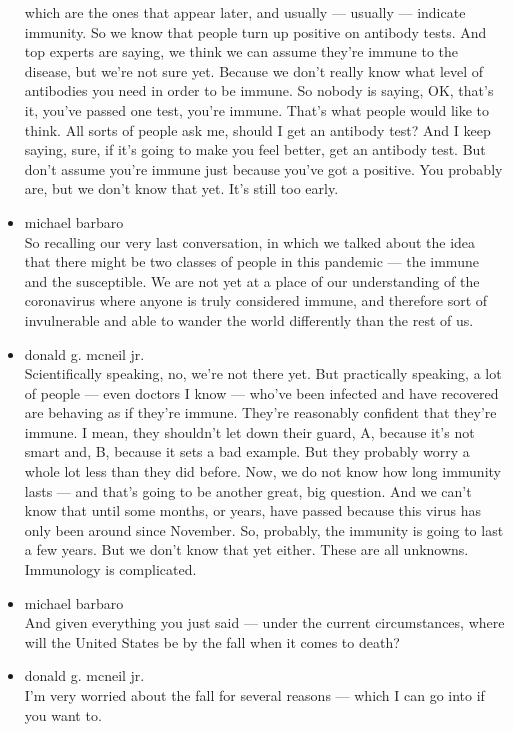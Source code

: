 \begin{itemize}
  which are the ones that appear later, and usually --- usually ---
  indicate immunity. So we know that people turn up positive on antibody
  tests. And top experts are saying, we think we can assume they're
  immune to the disease, but we're not sure yet. Because we don't really
  know what level of antibodies you need in order to be immune. So
  nobody is saying, OK, that's it, you've passed one test, you're
  immune. That's what people would like to think. All sorts of people
  ask me, should I get an antibody test? And I keep saying, sure, if
  it's going to make you feel better, get an antibody test. But don't
  assume you're immune just because you've got a positive. You probably
  are, but we don't know that yet. It's still too early.
\item
  michael barbaro\\
  So recalling our very last conversation, in which we talked about the
  idea that there might be two classes of people in this pandemic ---
  the immune and the susceptible. We are not yet at a place of our
  understanding of the coronavirus where anyone is truly considered
  immune, and therefore sort of invulnerable and able to wander the
  world differently than the rest of us.
\item
  donald g. mcneil jr.\\
  Scientifically speaking, no, we're not there yet. But practically
  speaking, a lot of people --- even doctors I know --- who've been
  infected and have recovered are behaving as if they're immune. They're
  reasonably confident that they're immune. I mean, they shouldn't let
  down their guard, A, because it's not smart and, B, because it sets a
  bad example. But they probably worry a whole lot less than they did
  before. Now, we do not know how long immunity lasts --- and that's
  going to be another great, big question. And we can't know that until
  some months, or years, have passed because this virus has only been
  around since November. So, probably, the immunity is going to last a
  few years. But we don't know that yet either. These are all unknowns.
  Immunology is complicated.
\item
  michael barbaro\\
  And given everything you just said --- under the current
  circumstances, where will the United States be by the fall when it
  comes to death?
\item
  donald g. mcneil jr.\\
  I'm very worried about the fall for several reasons --- which I can go
  into if you want to.

\end{itemize}

